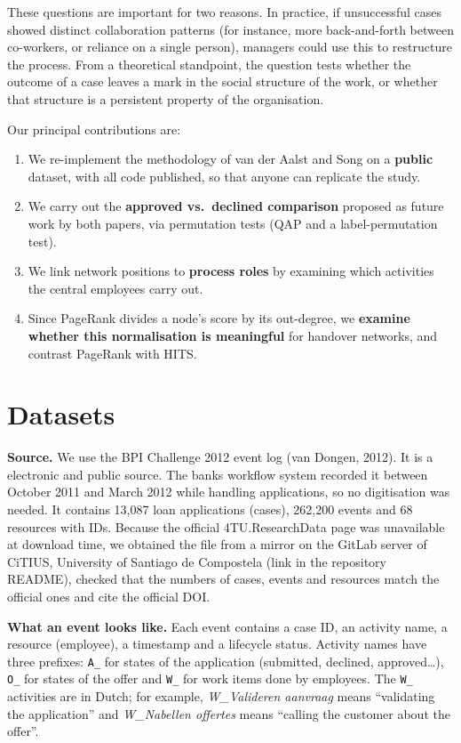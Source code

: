 \documentclass[12pt, a4paper]{article}
\begin{document}
These questions are important for two reasons. In practice, if unsuccessful cases showed distinct collaboration patterns (for instance, more back-and-forth between co-workers, or reliance on a single person), managers could use this to restructure the process. From a theoretical standpoint, the question tests whether the outcome of a case leaves a mark in the social structure of the work, or whether that structure is a persistent property of the organisation.

Our principal contributions are:
\begin{enumerate}[itemsep=2pt]
  \item We re-implement the methodology of van der Aalst and Song on a \textbf{public} dataset, with all code published, so that anyone can replicate the study.
  \item We carry out the \textbf{approved vs.\ declined comparison} proposed as future work by both papers, via permutation tests (QAP and a label-permutation test).
  \item We link network positions to \textbf{process roles} by examining which activities the central employees carry out.
  \item Since PageRank divides a node's score by its out-degree, we \textbf{examine whether this normalisation is meaningful} for handover networks, and contrast PageRank with HITS.
\end{enumerate}

\section{Datasets}
\label{datasets}

\textbf{Source.} We use the BPI Challenge 2012 event log (van Dongen, 2012). It is a electronic and public source. The banks workflow system recorded it between October 2011 and March 2012 while handling applications, so no digitisation was needed. It contains 13,087 loan applications (cases), 262,200 events and 68 resources with IDs. Because the official 4TU.ResearchData page was unavailable at download time, we obtained the file from a mirror on the GitLab server of CiTIUS, University of Santiago de Compostela (link in the repository README), checked that the numbers of cases, events and resources match the official ones and cite the official DOI.

\textbf{What an event looks like.} Each event contains a case ID, an activity name, a resource (employee), a timestamp and a lifecycle status. Activity names have three prefixes: \texttt{A\_} for states of the application (submitted, declined, approved\dots), \texttt{O\_} for states of the offer and \texttt{W\_} for work items done by employees. The \texttt{W\_} activities are in Dutch; for example, \emph{W\_Valideren aanvraag} means ``validating the application'' and \emph{W\_Nabellen offertes} means ``calling the customer about the offer''.
\end{document}
